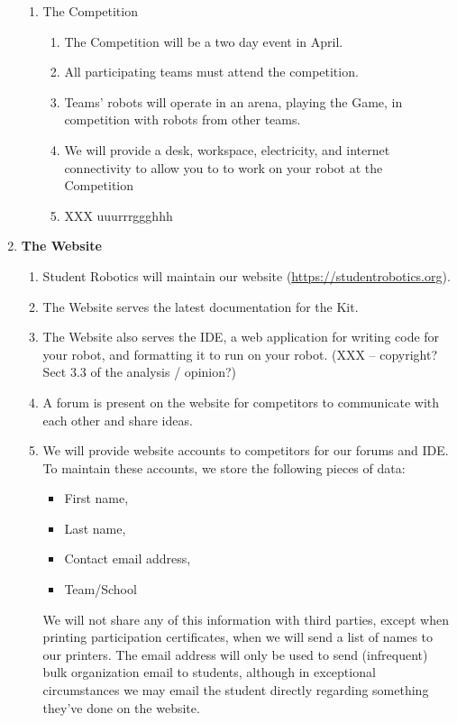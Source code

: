 \documentclass[a4paper, 11pt]{scrartcl}
\begin{document}
\begin{enumerate}
\begin{enumerate}
\item The Competition
\begin{enumerate}

\item The Competition will be a two day event in April.

\item All participating teams must attend the competition.

\item Teams' robots will operate in an arena, playing the Game, in competition
with robots from other teams.

\item We will provide a desk, workspace, electricity, and internet connectivity
to allow you to to work on your robot at the Competition

\item XXX uuurrrggghhh

\end{enumerate}
\end{enumerate}

\item \textbf{The Website}
\begin{enumerate}

\item Student Robotics will maintain our website (\url{https://studentrobotics.org}).

\item The Website serves the latest documentation for the Kit.

\item The Website also serves the IDE, a web application for writing code for
your robot, and formatting it to run on your robot. (XXX -- copyright?
Sect 3.3 of the analysis / opinion?)

\item A forum is present on the website for competitors to communicate with
each other and share ideas.

\item We will provide website accounts to competitors for our forums and IDE. To
maintain these accounts, we store the following pieces of data:

\begin{itemize}
\item First name,
\item Last name,
\item Contact email address,
\item Team/School
\end{itemize}
We will not share any of this information with third parties, except when
printing participation certificates, when we will send a list of names to
our printers. The email address will only be used to send (infrequent) bulk
organization email to students, although in exceptional circumstances we
may email the student directly regarding something they've done on the
website.


\end{enumerate}
\end{enumerate}
\end{document}

